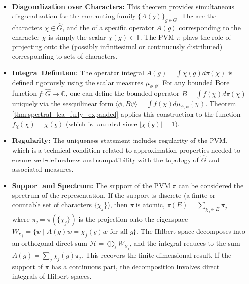 \begin{remark}
    \,
\begin{itemize}
    \item \textbf{Diagonalization over Characters:} This theorem provides simultaneous diagonalization for the commuting family $\{A(g)\}_{g \in G}$. The  are the characters $\chi \in \hat{G}$, and the  of a specific operator $A(g)$ corresponding to the character $\chi$ is simply the scalar $\chi(g) \in \mathbb{T}$. The PVM $\pi$ plays the role of projecting onto the (possibly infinitesimal or continuously distributed)  corresponding to sets of characters.
    \item \textbf{Integral Definition:} The operator integral $A(g) = \int \chi(g) d\pi(\chi)$ is defined rigorously using the scalar measures $\mu_{\phi,\psi}$. For any bounded Borel function $f: \hat{G} \to \mathbb{C}$, one can define the bounded operator $B = \int f(\chi) d\pi(\chi)$ uniquely via the sesquilinear form $\langle \phi, B\psi \rangle = \int f(\chi) d\mu_{\phi,\psi}(\chi)$. Theorem \ref{thm:spectral_lca_fully_expanded} applies this construction to the function $f_\chi(\chi) = \chi(g)$ (which is bounded since $|\chi(g)|=1$).
    \item \textbf{Regularity:} The uniqueness statement includes regularity of the PVM, which is a technical condition related to approximation properties needed to ensure well-definedness and compatibility with the topology of $\hat{G}$ and associated measures.
    \item \textbf{Support and Spectrum:} The support of the PVM $\pi$ can be considered the spectrum of the representation. If the support is discrete (a finite or countable set of characters $\{\chi_j\}$), then $\pi$ is atomic, $\pi(E) = \sum_{\chi_j \in E} \pi_j$ where $\pi_j = \pi(\{\chi_j\})$ is the projection onto the eigenspace $W_{\chi_j} = \{w \mid A(g)w = \chi_j(g)w \text{ for all } g\}$. The Hilbert space decomposes into an orthogonal direct sum $\mathcal{H} = \bigoplus_j W_{\chi_j}$, and the integral reduces to the sum $A(g) = \sum_j \chi_j(g) \pi_j$. This recovers the finite-dimensional result. If the support of $\pi$ has a continuous part, the decomposition involves direct integrals of Hilbert spaces.
\end{itemize}
\end{remark}

